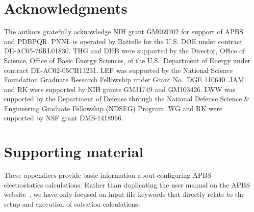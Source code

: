 \documentclass[12pt,titlepage]{article}
\begin{document}
\section*{Acknowledgments}
The authors gratefully acknowledge NIH grant GM069702 for support of APBS and PDB\-PQR.
PNNL is operated by Battelle for the U.S. DOE under contract DE-AC05-76RL01830.  
THG and DHB were supported by the Director, Office of Science, Office of Basic Energy Sciences, of the U.S.~Department of Energy under contract DE-AC02-05CH11231.
LEF was supported by the National Science Foundation Graduate Research Fellowship under Grant No.~DGE 110640.
JAM and RK were supported by NIH grants GM31749 and GM103426.
LWW was supported by the Department of Defense through the National Defense Science \& Engineering Graduate Fellowship (NDSEG) Program.
WG and RK were supported by NSF grant DMS-1418966.


\pagebreak
\appendix

\section{Supporting material}
\renewcommand{\thefigure}{S\arabic{figure}}
\setcounter{figure}{0}

These appendices provide basic information about configuring APBS electrostatics calculations. 
Rather than duplicating the user manual on the APBS website~\cite{APBSweb}, we have only focused on input file keywords that directly relate to the setup and execution of solvation calculations.
\end{document}
